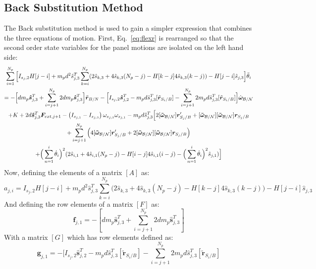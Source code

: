 \subsection{Back Substitution Method}
The Back substitution method is used to gain a simpler expression that combines the three equations of motion. First, Eq.~\eqref{eq:flexr} is rearranged so that the second order state variables for the panel motions are isolated on the left hand side:
\begin{multline}
	\sum^{N_p}_{i=1}\Big[I_{s_j,2} H[j-i] + m_p d^2 \hat{s}^{T}_{j,3} \sum^{N_p}_{k=i}(2\hat{s}_{k,3}+4\hat{s}_{k,3}(N_p-j) -H[k-j] 4\hat{s}_{k,3}(k-j)) - H[j-i]\hat{s}_{j,3} \Big] \ddot{\theta}_i \\
	= - \Big[d m_p\bm{\hat{s}}^{T}_{j,3}+\sum^{N_p}_{i=j+1}2 d m_p\bm{\hat{s}}^{T}_{j,3}\Big]\ddot{\bm r}_{B/N} - \Big[I_{s_j,2} \bm{\hat{s}}_{j,2}^T -m_p d \hat{s}^{T}_{j,3}[\tilde{{\bm r}}_{S_{i}/B}]-\sum^{N_p}_{i=j+1} 2 m_p d \hat{s}^{T}_{j,3}[\tilde{{\bm r}}_{S_{i}/B}]\Big]\dot{\bm\omega}_{\cal B/N} \\
	+ K + 2d\bm{\hat{s}}^{T}_{j,3}\bm F_{ext,j+1} - \left( I_{s_{j,1}} - I_{s_{j,3}}\right) \omega_{s_{j,3}} \omega_{s_{j,1}} - m_p d \hat{s}^{T}_{j,3}\Big[2[\bm{\tilde{\omega}}_{\cal B/N}]\bm r'_{S_{j}/B} + [\bm{\tilde{\omega}}_{\cal B/N}][\bm{\tilde{\omega}}_{\cal B/N}]\bm r_{S_{j}/B}\\
	+\sum^{N_p}_{i=j+1}\Big(4[\bm{\tilde{\omega}}_{\cal B/N}]\bm r'_{S_{j}/B} + 2[\bm{\tilde{\omega}}_{\cal B/N}][\bm{\tilde{\omega}}_{\cal B/N}]\bm r_{S_{j}/B} \Big) \\
	+ \Big( \sum^{i}_{n=1} \dot{\theta}_i \Big)^2 (2\hat{s}_{i,1}+4\hat{s}_{i,1}(N_p-j) -H[i-j] 4\hat{s}_{i,1}(i-j) - \Big( \sum^{i}_{n=1} \dot{\theta}_i\Big)^2 \hat{s}_{j,1} )\Big]
	\label{eq:spMotion1}
\end{multline}
Now, defining the elements of a matrix $[A]$ as:
\begin{equation}
	a_{j,i} = I_{s_j,2} H[j-i] + m_p d^2 \hat{s}^{T}_{j,3} \sum^{N_p}_{k=i}\Big(2\hat{s}_{k,3}+4\hat{s}_{k,3}(N_p-j) -H[k-j] 4\hat{s}_{k,3}(k-j)\Big) - H[j-i]\hat{s}_{j,3}
\end{equation}
And defining the row elements of a matrix $[F]$ as:
\begin{equation}
	\bm f_{j,1} =  - [d m_p \bm{\hat{s}}^{T}_{j,3}+\sum^{N_p}_{i=j+1}2 d m_p\bm{\hat{s}}^{T}_{j,3}]
\end{equation}
With a matrix $[G]$ which has row elements defined as:
\begin{equation}
	\bm g_{j,1} =  -[I_{s_j,2} \bm{\hat{s}}_{j,2}^T -m_p d \hat{s}^{T}_{j,3}[\tilde{{\bm r}}_{S_{i}/B}]-\sum^{N_p}_{i=j+1} 2 m_p d \hat{s}^{T}_{j,3}[\tilde{{\bm r}}_{S_{i}/B}]
\end{equation}
